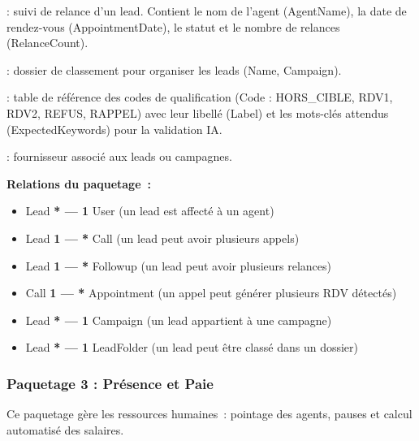 \begin{description}[itemsep=4pt]
    \item[\textbf{Followup}] : suivi de relance d'un lead. Contient le nom de l'agent
    (AgentName), la date de rendez-vous (AppointmentDate), le statut et le nombre de
    relances (RelanceCount).

    \item[\textbf{LeadFolder}] : dossier de classement pour organiser les leads
    (Name, Campaign).

    \item[\textbf{Qualification}] : table de référence des codes de qualification
    (Code : HORS\_CIBLE, RDV1, RDV2, REFUS, RAPPEL) avec leur libellé (Label) et
    les mots-clés attendus (ExpectedKeywords) pour la validation IA.

    \item[\textbf{Supplier}] : fournisseur associé aux leads ou campagnes.
\end{description}

\textbf{Relations du paquetage~:}
\begin{itemize}
    \item Lead \textbf{* --- 1} User (un lead est affecté à un agent)
    \item Lead \textbf{1 --- *} Call (un lead peut avoir plusieurs appels)
    \item Lead \textbf{1 --- *} Followup (un lead peut avoir plusieurs relances)
    \item Call \textbf{1 --- *} Appointment (un appel peut générer plusieurs RDV détectés)
    \item Lead \textbf{* --- 1} Campaign (un lead appartient à une campagne)
    \item Lead \textbf{* --- 1} LeadFolder (un lead peut être classé dans un dossier)
\end{itemize}

\subsubsection{Paquetage 3 : Présence et Paie}

Ce paquetage gère les ressources humaines~: pointage des agents, pauses et calcul
automatisé des salaires.

